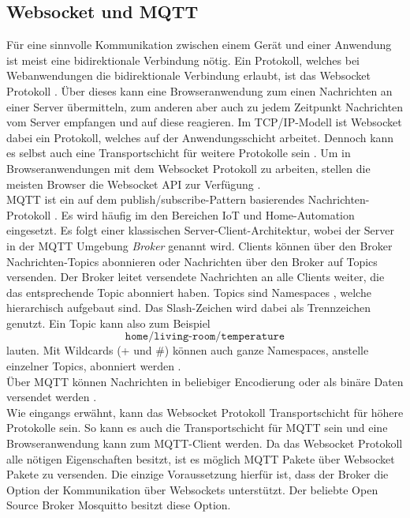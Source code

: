 \subsection{Websocket und MQTT}
\label{subs:websocket-und-mqtt}

Für eine sinnvolle Kommunikation zwischen einem Gerät und einer Anwendung ist meist
eine bidirektionale Verbindung nötig. Ein Protokoll, welches bei Webanwendungen die 
bidirektionale Verbindung erlaubt, ist das Websocket Protokoll \cite{rfc-websocket}. Über dieses
kann eine Browseranwendung zum einen Nachrichten an einer Server übermitteln, zum anderen 
aber auch zu jedem Zeitpunkt Nachrichten vom Server empfangen und auf diese reagieren.
Im TCP/IP-Modell ist Websocket dabei ein Protokoll, welches auf der Anwendungsschicht arbeitet. 
Dennoch kann es selbst auch eine Transportschicht für weitere Protokolle sein \cite{websocket-definitive}.
Um in Browseranwendungen mit dem Websocket Protokoll zu arbeiten, stellen die meisten 
Browser die Websocket API zur Verfügung \cite{websocket-api}.\\

MQTT ist ein auf dem publish/subscribe-Pattern basierendes Nachrichten-Protokoll \cite{mqtt-standard}.
Es wird häufig im den Bereichen IoT und Home-Automation eingesetzt. Es folgt einer
klassischen Server-Client-Architektur, wobei der Server in der MQTT Umgebung \emph{Broker}
genannt wird. Clients können über den Broker Nachrichten-Topics abonnieren oder Nachrichten
über den Broker auf Topics versenden. Der Broker leitet versendete Nachrichten an alle Clients
weiter, die das entsprechende Topic abonniert haben. Topics sind Namespaces , welche hierarchisch
aufgebaut sind. Das Slash-Zeichen wird dabei als Trennzeichen genutzt. Ein Topic kann also zum 
Beispiel 
\[\texttt{home/living-room/temperature} \]
lauten. Mit Wildcards (+ und \#) können auch ganze
Namespaces, anstelle einzelner Topics, abonniert werden \cite{mqtt-man-page}.\\
Über MQTT können Nachrichten in beliebiger Encodierung oder als binäre Daten versendet werden
\cite{mqtt-essentials-part-4}.\\

Wie eingangs erwähnt, kann das Websocket Protokoll Transportschicht für
höhere Protokolle sein. So kann es auch die Transportschicht für MQTT sein und eine Browseranwendung
kann zum MQTT-Client werden. Da das Websocket Protokoll alle nötigen Eigenschaften besitzt, ist es
möglich MQTT Pakete über Websocket Pakete zu versenden. Die einzige Voraussetzung hierfür ist, dass der Broker
die Option der Kommunikation über Websockets unterstützt. Der beliebte Open Source Broker Mosquitto \cite{mosquitto}
besitzt diese Option.